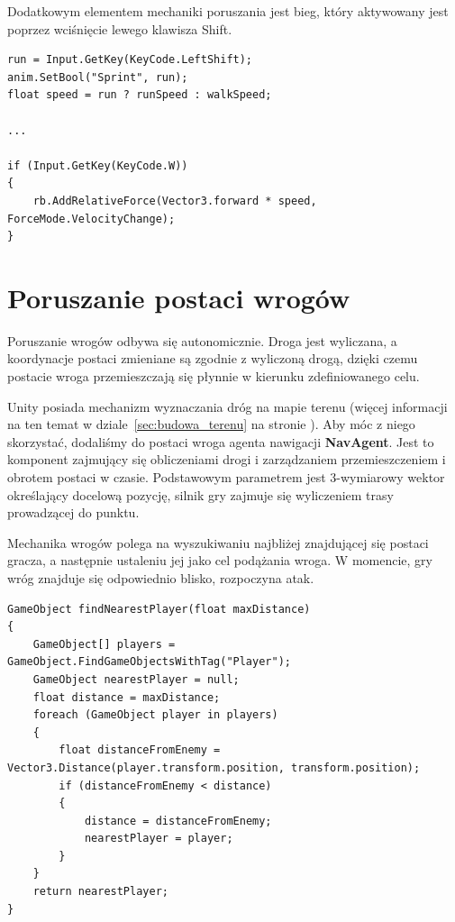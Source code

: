 \documentclass[openright]{xmgr}
\newcommand{\name}[1]{\textbf{\textcolor{NavyBlue}{#1}}}
\begin{document}
      Dodatkowym elementem mechaniki poruszania jest bieg, który aktywowany jest poprzez wciśnięcie lewego klawisza Shift.

\begin{minipage}{\textwidth}
\begin{lstlisting}[caption={Fragment kodu mechaniki biegania -- reakcja na wciśnięcie klawisza \name{W}}]
run = Input.GetKey(KeyCode.LeftShift);
anim.SetBool("Sprint", run);
float speed = run ? runSpeed : walkSpeed;

...

if (Input.GetKey(KeyCode.W))
{
    rb.AddRelativeForce(Vector3.forward * speed, ForceMode.VelocityChange);
}
\end{lstlisting}
\end{minipage}

  \section{Poruszanie postaci wrogów}\label{sec:poruszanie_wrogow}

    Poruszanie wrogów odbywa się autonomicznie. Droga jest wyliczana, a koordynacje postaci zmieniane są zgodnie z wyliczoną drogą, dzięki czemu postacie wroga przemieszczają się płynnie w kierunku zdefiniowanego celu.

    Unity posiada mechanizm wyznaczania dróg na mapie terenu (więcej informacji na ten temat w dziale~\ref{sec:budowa_terenu} na stronie \pageref{sec:budowa_terenu}). Aby móc z niego skorzystać, dodaliśmy do postaci wroga agenta nawigacji \name{NavAgent}. Jest to komponent zajmujący się obliczeniami drogi i zarządzaniem przemieszczeniem i obrotem postaci w czasie. Podstawowym parametrem jest 3-wymiarowy wektor określający docelową pozycję, silnik gry zajmuje się wyliczeniem trasy prowadzącej do punktu.

    Mechanika wrogów polega na wyszukiwaniu najbliżej znajdującej się postaci gracza, a następnie ustaleniu jej jako cel podążania wroga. W momencie, gry wróg znajduje się odpowiednio blisko, rozpoczyna atak.

\begin{minipage}{\textwidth}
\begin{lstlisting}[caption={Algorytm zwracający wskaźnik do obiektu znajdującego się najbliżej, przy określonym maksymalnym promieniu poszukiwań}]
GameObject findNearestPlayer(float maxDistance)
{
    GameObject[] players = GameObject.FindGameObjectsWithTag("Player");
    GameObject nearestPlayer = null;
    float distance = maxDistance;
    foreach (GameObject player in players)
    {
        float distanceFromEnemy = Vector3.Distance(player.transform.position, transform.position);
        if (distanceFromEnemy < distance)
        {
            distance = distanceFromEnemy;
            nearestPlayer = player;
        }
    }
    return nearestPlayer;
}
\end{lstlisting}
\end{minipage}
\end{document}
